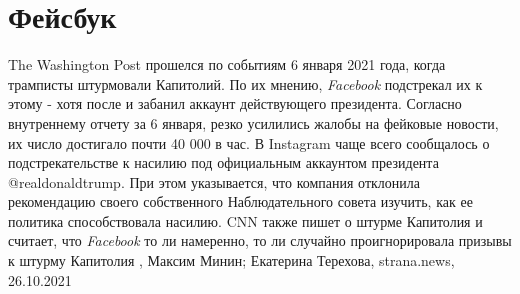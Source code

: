  
 
 
 
 
\chapter{Фейсбук}

The Washington Post прошелся по событиям 6 января 2021 года, когда трамписты
штурмовали Капитолий. По их мнению, \emph{Facebook} подстрекал их к этому -
хотя после и забанил аккаунт действующего президента.  Согласно внутреннему
отчету за 6 января, резко усилились жалобы на фейковые новости, их число
достигало почти 40 000 в час. В Instagram чаще всего сообщалось о
подстрекательстве к насилию под официальным аккаунтом президента
@realdonaldtrump.  При этом указывается, что компания отклонила рекомендацию
своего собственного Наблюдательного совета изучить, как ее политика
способствовала насилию.  CNN также пишет о штурме Капитолия и считает, что
\emph{Facebook} то ли намеренно, то ли случайно проигнорировала призывы к
штурму Капитолия
, 
Максим Минин; Екатерина Терехова, strana.news, 26.10.2021
